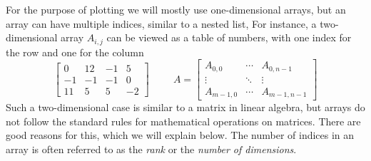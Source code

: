 \documentclass[graybox,envcountchap,sectrefs,final]{svmonodo}
\begin{document}
For the purpose of plotting we will mostly use one-dimensional arrays, but an array can have multiple indices,
similar to a nested list, For instance, a two-dimensional array $A_{i,j}$ can be viewed as a table of numbers,
with one index for the row and one for the column
\[
\left\lbrack\begin{array}{cccc}
0 & 12 & -1 & 5\\ 
-1 & -1 & -1 & 0\\ 
11 & 5 & 5 & -2
\end{array}\right\rbrack
\hspace{1cm}
A =
\left\lbrack\begin{array}{ccc}
A_{0,0} & \cdots &  A_{0,n-1}\\ 
\vdots & \ddots &  \vdots\\ 
A_{m-1,0} & \cdots & A_{m-1,n-1}
\end{array}\right\rbrack
\]
Such a two-dimensional case is similar to a matrix in linear algebra, but arrays do not follow the standard rules
for mathematical operations on matrices. There are good reasons for this, which we will explain below.
The number of indices in an array is often referred to as the \emph{rank} or the \emph{number of dimensions}.
\end{document}
